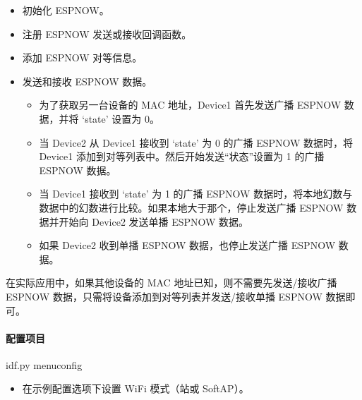 \documentclass[a4paper,12pt,english]{sphinxmanual}
\begin{document}
{{\begin{itemize}
\item {} 
\sphinxAtStartPar
初始化 ESP\sphinxhyphen{}NOW。

\item {} 
\sphinxAtStartPar
注册 ESP\sphinxhyphen{}NOW 发送或接收回调函数。

\item {} 
\sphinxAtStartPar
添加 ESP\sphinxhyphen{}NOW 对等信息。

\item {} 
\sphinxAtStartPar
发送和接收 ESP\sphinxhyphen{}NOW 数据。
\begin{itemize}
\item {} 
\sphinxAtStartPar
为了获取另一台设备的 MAC 地址，Device1 首先发送广播 ESP\sphinxhyphen{}NOW 数据，并将 ‘state’ 设置为 0。

\item {} 
\sphinxAtStartPar
当 Device2 从 Device1 接收到 ‘state’ 为 0 的广播 ESP\sphinxhyphen{}NOW 数据时，将 Device1 添加到对等列表中。然后开始发送“状态”设置为 1 的广播 ESP\sphinxhyphen{}NOW 数据。

\item {} 
\sphinxAtStartPar
当 Device1 接收到 ‘state’ 为 1 的广播 ESP\sphinxhyphen{}NOW 数据时，将本地幻数与数据中的幻数进行比较。如果本地大于那个，停止发送广播 ESP\sphinxhyphen{}NOW 数据并开始向 Device2 发送单播 ESPNOW 数据。

\item {} 
\sphinxAtStartPar
如果 Device2 收到单播 ESP\sphinxhyphen{}NOW 数据，也停止发送广播 ESP\sphinxhyphen{}NOW 数据。

\end{itemize}

\end{itemize}

\sphinxAtStartPar
在实际应用中，如果其他设备的 MAC 地址已知，则不需要先发送/接收广播 ESPNOW 数据，只需将设备添加到对等列表并发送/接收单播 ESP\sphinxhyphen{}NOW 数据即可。


\paragraph{配置项目}
\label{\detokenize{exp-esp32/wifi/esp-now:id9}}
\begin{sphinxVerbatim}[commandchars=\\\{\}]
idf.py menuconfig
\end{sphinxVerbatim}
\begin{itemize}
\item {} 
\sphinxAtStartPar
在示例配置选项下设置 WiFi 模式（站或 SoftAP）。


\end{itemize}}}
\end{document}

